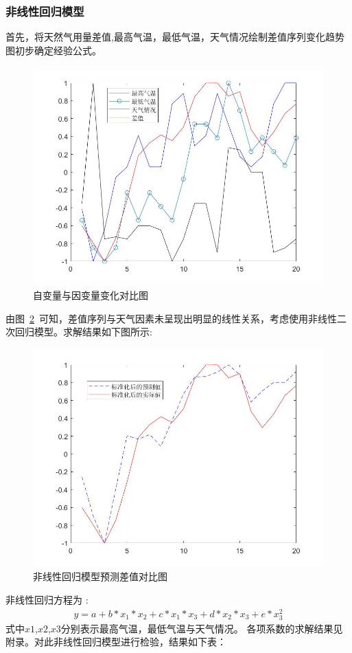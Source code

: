 \documentclass{whutmod}
\begin{document}
	\subsubsection{非线性回归模型}
	首先，将天然气用量差值,最高气温，最低气温，天气情况绘制差值序列变化趋势图初步确定经验公式。
	\begin{figure}[H]
		\centering
		\includegraphics[width=\textwidth]{figures/hgfx1.jpg}
		\caption{自变量与因变量变化对比图}\label{img003}
	\end{figure}	
	由图~\ref{img003}~可知，差值序列与天气因素未呈现出明显的线性关系，考虑使用非线性二次回归模型。求解结果如下图所示:
		\begin{figure}[H]
			\centering
			\includegraphics[width=\textwidth]{figures/hgfx2.jpg}
			\caption{非线性回归模型预测差值对比图}\label{img003}
		\end{figure}	
		非线性回归方程为 :
			\begin{gather}
		y =a + b*x_{1}*x_{2} + c*x_{1}*x_{3} +d*x_{2}*x_{3} + e*x_{3}^2
			\end{gather}
			式中$x1$,$x2$,$x3$分别表示最高气温，最低气温与天气情况。
各项系数的求解结果见附录。对此非线性回归模型进行检验，结果如下表：
	
\end{document}
